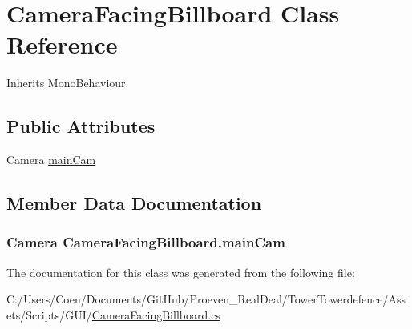 \hypertarget{class_camera_facing_billboard}{}\section{Camera\+Facing\+Billboard Class Reference}
\label{class_camera_facing_billboard}


Inherits Mono\+Behaviour.

\subsection*{Public Attributes}
\begin{DoxyCompactItemize}
\item 
Camera \hyperlink{class_camera_facing_billboard_af1e518612b89a6fa9e67a7f4fd37144a}{main\+Cam}
\end{DoxyCompactItemize}


\subsection{Member Data Documentation}
\subsubsection[{\texorpdfstring{main\+Cam}{mainCam}}]{\setlength{\rightskip}{0pt plus 5cm}Camera Camera\+Facing\+Billboard.\+main\+Cam}\hypertarget{class_camera_facing_billboard_af1e518612b89a6fa9e67a7f4fd37144a}{}\label{class_camera_facing_billboard_af1e518612b89a6fa9e67a7f4fd37144a}


The documentation for this class was generated from the following file\+:\begin{DoxyCompactItemize}
\item 
C\+:/\+Users/\+Coen/\+Documents/\+Git\+Hub/\+Proeven\+\_\+\+Real\+Deal/\+Tower\+Towerdefence/\+Assets/\+Scripts/\+G\+U\+I/\hyperlink{_camera_facing_billboard_8cs}{Camera\+Facing\+Billboard.\+cs}\end{DoxyCompactItemize}
